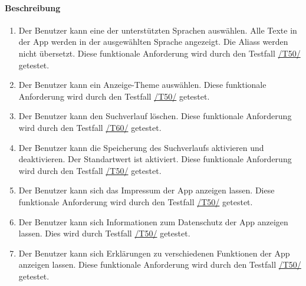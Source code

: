 \paragraph{Beschreibung}
\begin{enumerate}[start=51, label=\textbf{/FA\arabic*/}, align=left]
    \item \label{/FA51/} Der \Gls{Benutzer} kann eine der unterstützten Sprachen auswählen. Alle Texte in der App werden in der ausgewählten Sprache angezeigt. Die \Glspl{Alias} werden nicht übersetzt. Diese funktionale Anforderung wird durch den Testfall \hyperref[/T50/]{/T50/} getestet.
    \item \label{/FA52/} Der \Gls{Benutzer} kann ein Anzeige-\Gls{Theme} auswählen. Diese funktionale Anforderung wird durch den Testfall \hyperref[/T50/]{/T50/} getestet.
    \item \label{/FA53/} Der \Gls{Benutzer} kann den \Gls{Suchverlauf} löschen. Diese funktionale Anforderung wird durch den Testfall \hyperref[/T60/]{/T60/} getestet.
    \item \label{/FA54/} Der \Gls{Benutzer} kann die Speicherung des \Gls{Suchverlauf}s aktivieren und deaktivieren. Der Standartwert ist \dq aktiviert\dq{}. Diese funktionale Anforderung wird durch den Testfall \hyperref[/T50/]{/T50/} getestet.
    \item \label{/FA55/} Der \Gls{Benutzer} kann sich das Impressum der App anzeigen lassen. Diese funktionale Anforderung wird durch den Testfall \hyperref[/T50/]{/T50/} getestet.
    \item \label{/FA56/} Der \Gls{Benutzer} kann sich Informationen zum Datenschutz der App anzeigen lassen. Dies wird durch Testfall \hyperref[/T50/]{/T50/} getestet.
    \item \label{/FA57/} Der \Gls{Benutzer} kann sich Erklärungen zu verschiedenen Funktionen der App anzeigen lassen. Diese funktionale Anforderung wird durch den Testfall \hyperref[/T50/]{/T50/} getestet.
\end{enumerate}